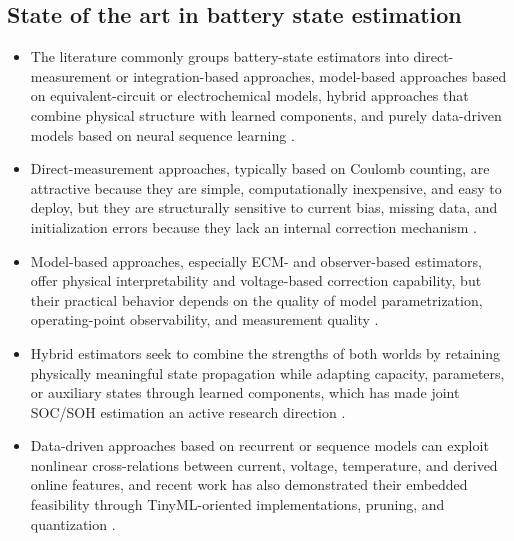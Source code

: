 \documentclass[review]{elsarticle}
\begin{document}
\subsection{State of the art in battery state estimation}
\begin{itemize}[leftmargin=*]
    \item The literature commonly groups battery-state estimators into direct-measurement or integration-based approaches, model-based approaches based on equivalent-circuit or electrochemical models, hybrid approaches that combine physical structure with learned components, and purely data-driven models based on neural sequence learning \cite{khanComparativeStudyDifferent2022,shrivastavaReviewTechnologicalAdvancement2023,guoSystematicReviewElectrochemical2024,yaoSmarterBatteryManagement2025b}.
    \item Direct-measurement approaches, typically based on Coulomb counting, are attractive because they are simple, computationally inexpensive, and easy to deploy, but they are structurally sensitive to current bias, missing data, and initialization errors because they lack an internal correction mechanism \cite{khanComparativeStudyDifferent2022,liRobustnessSOCEstimation2015}.
    \item Model-based approaches, especially ECM- and observer-based estimators, offer physical interpretability and voltage-based correction capability, but their practical behavior depends on the quality of model parametrization, operating-point observability, and measurement quality \cite{gaoEnhancedStateofchargeEstimation2022,guoSystematicReviewElectrochemical2024,liRobustnessSOCEstimation2015}.
    \item Hybrid estimators seek to combine the strengths of both worlds by retaining physically meaningful state propagation while adapting capacity, parameters, or auxiliary states through learned components, which has made joint SOC/SOH estimation an active research direction \cite{gaoCoEstimationStateofChargeStateof2022,shenAlternativeCombinedCoestimation2022,wangFusionEstimationLithiumion2022}.
    \item Data-driven approaches based on recurrent or sequence models can exploit nonlinear cross-relations between current, voltage, temperature, and derived online features, and recent work has also demonstrated their embedded feasibility through TinyML-oriented implementations, pruning, and quantization \cite{mondalEstimatingStateofChargeLithiumIon2024,Embedded_AI_only_SOC_mobile,giazitzisCaseStudyTiny2024,mazziStateChargeEstimation2022,yaoSmarterBatteryManagement2025b}.
\end{itemize}
\end{document}
